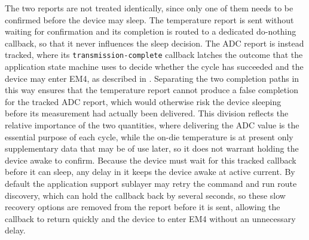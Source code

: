 The two reports are not treated identically, since only one of them needs to be confirmed before the device may sleep.
The temperature report is sent without waiting for confirmation and its completion is routed to a dedicated do-nothing callback, so that it never influences the sleep decision.
The ADC report is instead tracked, where its \texttt{transmission-complete} callback latches the outcome that the application state machine uses to decide whether the cycle has succeeded and the device may enter EM4, as described in .
Separating the two completion paths in this way ensures that the temperature report cannot produce a false completion for the tracked ADC report, which would otherwise risk the device sleeping before its measurement had actually been delivered.
This division reflects the relative importance of the two quantities, where delivering the ADC value is the essential purpose of each cycle, while the on-die temperature is at present only supplementary data that may be of use later, so it does not warrant holding the device awake to confirm.
Because the device must wait for this tracked callback before it can sleep, any delay in it keeps the device awake at active current.
By default the application support sublayer may retry the command and run route discovery, which can hold the callback back by several seconds, so these slow recovery options are removed from the report before it is sent, allowing the callback to return quickly and the device to enter EM4 without an unnecessary delay.
